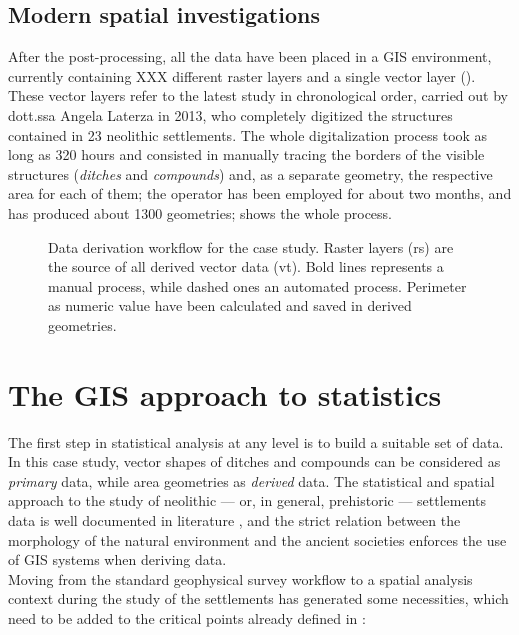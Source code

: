         \subsection{Modern spatial investigations}
            
            After the post-processing, all the data have been placed in a GIS environment, currently containing XXX different raster layers and a single vector layer (). These vector layers refer to the latest study in chronological order, carried out by dott.ssa Angela Laterza in 2013,
            who completely digitized the structures contained in 23 neolithic settlements. The whole digitalization process took as long as 320 hours and consisted in manually tracing the borders of the visible structures (\emph{ditches} and \emph{compounds}) and, as a separate geometry, the respective area for each of them; the operator has been employed for about two months, and has produced about 1300 geometries;  shows the whole process.

            \begin{figure}[htb]
                \resizebox{1.1\textwidth}{!}{%
                    
                }
                \caption[Data deriving workflow for the Tavoliere project]{Data derivation workflow for the case study. Raster layers (\textsf{rs}) are the source of all derived vector data (\textsf{vt}). Bold lines represents a manual process, while dashed ones an automated process. Perimeter as numeric value have been calculated and saved in derived geometries.}
                \label{fig:scheme-derive}
            \end{figure}

    \section{The GIS approach to statistics}
        The first step in statistical analysis at any level is to build a suitable set of data. In this case study, vector shapes of ditches and compounds can be considered as \emph{primary} data, while area geometries as \emph{derived} data.
        The statistical and spatial approach to the study of neolithic --- or, in general, prehistoric --- settlements data is well documented in literature \cite{arch-location-model}, and the strict relation between the morphology of the natural environment and the ancient societies enforces the use of GIS systems when deriving data.\\
        Moving from the standard geophysical survey workflow to a spatial analysis context during the study of the settlements has generated some necessities, which need to be added to the critical points already defined in :

